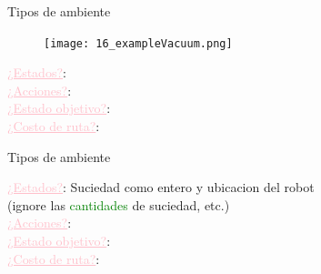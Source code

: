 \documentclass{beamer}
\theoremstyle{definition}
\theoremstyle{theorem}
\theoremstyle{remark}
\begin{document}

\begin{frame}{Tipos de ambiente}
        \begin{figure}\texttt{[image: 16\_exampleVacuum.png]}\end{figure}
        \small{
            \textcolor{Pink}{\underline{¿Estados?}}:\\
            \textcolor{Pink}{\underline{¿Acciones?}}:\\
            \textcolor{Pink}{\underline{¿Estado objetivo?}}:\\
            \textcolor{Pink}{\underline{¿Costo de ruta?}}: 
        }
        \break\break\break\break\break
\end{frame}


\begin{frame}{Tipos de ambiente}
    \small{
        \textcolor{Pink}{\underline{¿Estados?}}: Suciedad como entero y ubicacion del robot \\          \hspace{1.8cm} (ignore las \textcolor{Green}{cantidades} de suciedad, etc.) \\
        \textcolor{Pink}{\underline{¿Acciones?}}: \\
        \textcolor{Pink}{\underline{¿Estado objetivo?}}: \\
        \textcolor{Pink}{\underline{¿Costo de ruta?}}: 
    }
    \break\break\break\break\break
\end{frame}



\end{document}
